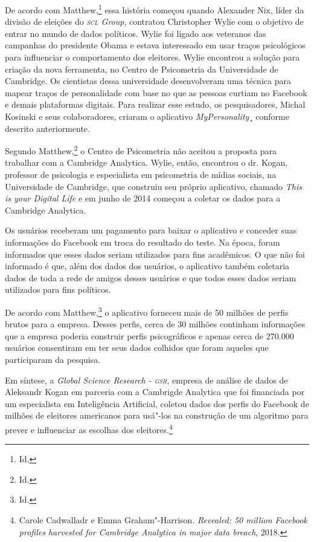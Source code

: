 De acordo com Matthew,\footnote{Id.} essa história começou quando
Alexander Nix, líder da divisão de eleições do \emph{\textsc{scl} Group},
contratou Christopher Wylie com o objetivo de entrar no mundo de dados
políticos. Wylie foi ligado aos veteranos das campanhas do presidente
Obama e estava interessado em usar traços psicológicos para influenciar
o comportamento dos eleitores. Wylie encontrou a solução para criação da
nova ferramenta, no Centro de Psicometria da Universidade de Cambridge.
Os cientistas dessa universidade desenvolveram uma técnica para mapear
traços de personalidade com base no que as pessoas curtiam no Facebook e
demais plataformas digitais. Para realizar esse estudo, os
pesquisadores, Michal Kosinski e seus colaboradores, criaram o
aplicativo \emph{MyPersonality}¸ conforme descrito anteriormente.

Segundo Matthew,\footnote{Id.} o Centro de Psicometria não aceitou a
proposta para trabalhar com a Cambridge Analytica. Wylie, então,
encontrou o dr. Kogan, professor de psicologia e especialista em
psicometria de mídias sociais, na Universidade de Cambridge, que
construiu seu próprio aplicativo, chamado \emph{This is your Digital
Life} e em junho de 2014 começou a coletar os dados para a Cambridge
Analytica.

Os usuários receberam um pagamento para baixar o aplicativo e conceder
suas informações do Facebook em troca do resultado do teste. Na época,
foram informados que esses dados seriam utilizados para fins acadêmicos.
O que não foi informado é que, além dos dados dos usuários, o aplicativo
também coletaria dados de toda a rede de amigos desses usuários e que
todos esses dados seriam utilizados para fins políticos.

De acordo com Matthew,\footnote{Id.} o aplicativo forneceu mais de 50
milhões de perfis brutos para a empresa. Desses perfis, cerca de 30
milhões continham informações que a empresa poderia construir perfis
psicográficos e apenas cerca de 270.000 usuários consentiram em ter seus
dados colhidos que foram aqueles que participaram da pesquisa.

Em síntese, a \emph{Global Science Research - \textsc{gsr}}, empresa de análise
de dados de Aleksandr Kogan em parceria com a Cambrigde Analytica que
foi financiada por um especialista em Inteligência Artificial, coletou
dados dos perfis do Facebook de milhões de eleitores americanos para
usá"-los na construção de um algoritmo para prever e influenciar as
escolhas dos eleitores.\footnote{Carole Cadwalladr e Emma Graham"-Harrison. \emph{Revealed: 50 million Facebook profiles harvested for Cambridge Analytica in major data
breach}, 2018.}

